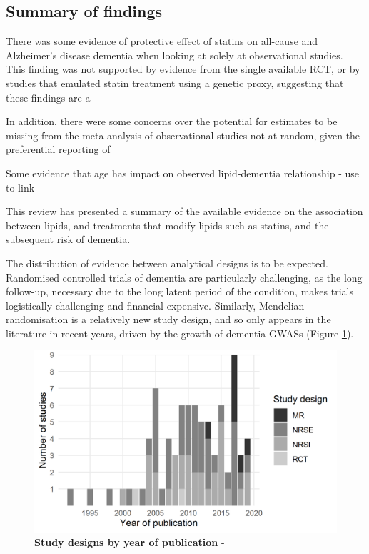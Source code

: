 \documentclass[a4paper, twoside]{templates/ociamthesis}
\begin{document}
\hypertarget{summary-of-findings}{%
\subsection{Summary of findings}\label{summary-of-findings}}

There was some evidence of protective effect of statins on all-cause and Alzheimer's disease dementia when looking at solely at observational studies. This finding was not supported by evidence from the single available RCT, or by studies that emulated statin treatment using a genetic proxy, suggesting that these findings are a

In addition, there were some concerns over the potential for estimates to be missing from the meta-analysis of observational studies not at random, given the preferential reporting of

Some evidence that age has impact on observed lipid-dementia relationship - use to link

This review has presented a summary of the available evidence on the association between lipids, and treatments that modify lipids such as statins, and the subsequent risk of dementia.

The distribution of evidence between analytical designs is to be expected. Randomised controlled trials of dementia are particularly challenging, as the long follow-up, necessary due to the long latent period of the condition, makes trials logistically challenging and financial expensive. Similarly, Mendelian randomisation is a relatively new study design, and so only appears in the literature in recent years, driven by the growth of dementia GWASs (Figure \ref{fig:typeByYear}).





\begin{figure}[H]
\includegraphics[width=1\linewidth]{figures/sys-rev/type_by_year} \caption[Study designs by year of publication]{\textbf{Study designs by year of publication} -}\label{fig:typeByYear}
\end{figure}
\end{document}
